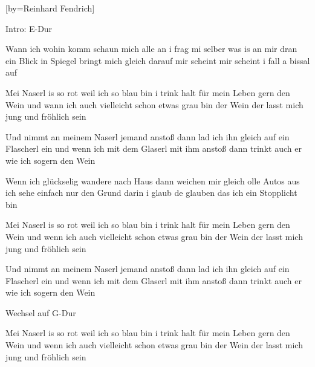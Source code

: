 
[by={Reinhard Fendrich}]

\chordson

\beginverse
\nolyrics Intro: E-Dur
\endverse

\beginverse
Wann ich wohin komm schaun mich alle an
i frag mi selber was is an mir dran
ein Blick in Spiegel bringt mich gleich darauf
mir scheint mir scheint i fall a bissal auf
\endverse

\beginchorus
Mei Naserl is so rot weil ich so blau bin
i trink halt für mein Leben gern den Wein
und wann ich auch vielleicht schon etwas grau bin
der Wein der lasst mich jung und fröhlich sein

Und nimmt an meinem Naserl jemand anstoß
dann lad ich ihn gleich auf ein Flascherl ein
und wenn ich mit dem Glaserl mit ihm anstoß
dann trinkt auch er wie ich sogern den Wein
\endchorus

\beginverse
Wenn ich glückselig wandere nach Haus
dann weichen mir gleich olle Autos aus
ich sehe einfach nur den Grund darin
i glaub de glauben das ich ein Stopplicht bin
\endverse

\beginchorus
Mei Naserl is so rot weil ich so blau bin
i trink halt für mein Leben gern den Wein
und wenn ich auch vielleicht schon etwas grau bin
der Wein der lasst mich jung und fröhlich sein

Und nimmt an meinem Naserl jemand anstoß
dann lad ich ihn gleich auf ein Flascherl ein
und wenn ich mit dem Glaserl mit ihm anstoß
dann trinkt auch er wie ich sogern den Wein
\endchorus

\beginverse
\nolyrics Wechsel auf G-Dur
\endverse

\beginchorus
Mei Naserl is so rot weil ich so blau bin
i trink halt für mein Leben gern den Wein
und wenn ich auch vielleicht schon etwas grau bin
der Wein der lasst mich jung und fröhlich sein
\endchorus


\endsong